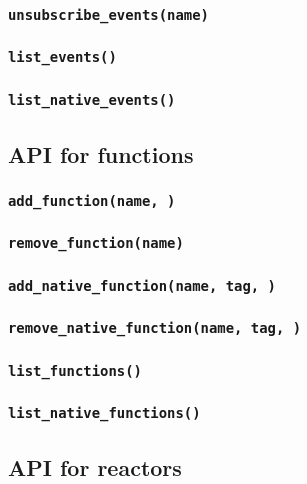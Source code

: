 \documentclass{note}
\begin{document}
\subsubsection{\textcolor{red2}{\texttt{unsubscribe\_events(name)}}}
\subsubsection{\textcolor{red2}{\texttt{list\_events()}}}
\subsubsection{\textcolor{red2}{\texttt{list\_native\_events()}}}


\subsection{API for functions}

\subsubsection{\textcolor{red2}{\texttt{add\_function(name, \textrm{})}}}
\subsubsection{\textcolor{red2}{\texttt{remove\_function(name)}}}
\subsubsection{\textcolor{red2}{\texttt{add\_native\_function(name, tag, \textrm{})}}}
\subsubsection{\textcolor{red2}{\texttt{remove\_native\_function(name, tag, \textrm{})}}}
\subsubsection{\textcolor{red2}{\texttt{list\_functions()}}}
\subsubsection{\textcolor{red2}{\texttt{list\_native\_functions()}}}


\subsection{API for reactors}
\end{document}
